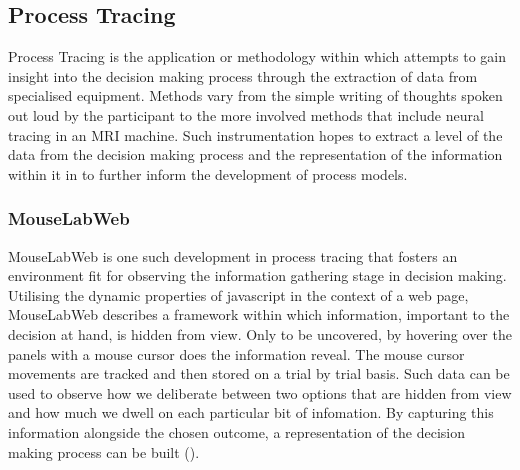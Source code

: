 \documentclass[man, floatsintext]{apa7}
\begin{document}

\subsection{Process Tracing}

Process Tracing is the application or methodology within which attempts to gain insight into the decision making process through the extraction of data from specialised equipment. Methods vary from the simple writing of thoughts spoken out loud by the participant to the more involved methods that include neural tracing in an MRI machine. Such instrumentation hopes to extract a level of the data from the decision making process and the representation of the information within it in to further inform the development of process models.

\subsubsection{MouseLabWeb}

MouseLabWeb is one such development in process tracing that fosters an environment fit for observing the information gathering stage in decision making. Utilising the dynamic properties of javascript in the context of a web page, MouseLabWeb describes a framework within which information, important to the decision at hand, is hidden from view. Only to be uncovered, by hovering over the panels with a mouse cursor does the information reveal. The mouse cursor movements are tracked and then stored on a trial by trial basis. Such data can be used to observe how we deliberate between two options that are hidden from view and how much we dwell on each particular bit of infomation. By capturing this information alongside the chosen outcome, a representation of the decision making process can be built (\cite{MouselabWEBa}).



\end{document}
